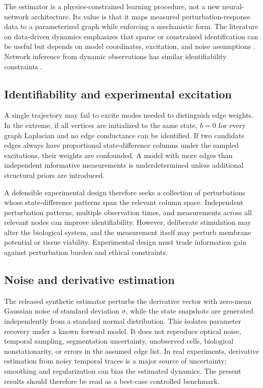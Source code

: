 \documentclass[12pt,a4paper]{article}
\begin{document}
The estimator is a physics-constrained learning procedure, not a new neural-network architecture. Its value is that it maps measured perturbation-response data to a parameterized graph while enforcing a mechanistic form. The literature on data-driven dynamics emphasizes that sparse or constrained identification can be useful but depends on model coordinates, excitation, and noise assumptions \citep{Brunton2016}. Network inference from dynamic observations has similar identifiability constraints \citep{ShandilyaTimme2011}.

\subsection{Identifiability and experimental excitation}
A single trajectory may fail to excite modes needed to distinguish edge weights. In the extreme, if all vertices are initialized to the same state, \(b=0\) for every graph Laplacian and no edge conductance can be identified. If two candidate edges always have proportional state-difference columns under the sampled excitations, their weights are confounded. A model with more edges than independent informative measurements is underdetermined unless additional structural priors are introduced.

A defensible experimental design therefore seeks a collection of perturbations whose state-difference patterns span the relevant column space. Independent perturbation patterns, multiple observation times, and measurements across all relevant nodes can improve identifiability. However, deliberate stimulation may alter the biological system, and the measurement itself may perturb membrane potential or tissue viability. Experimental design must trade information gain against perturbation burden and ethical constraints.

\subsection{Noise and derivative estimation}
The released synthetic estimator perturbs the derivative vector with zero-mean Gaussian noise of standard deviation \(\sigma\), while the state snapshots are generated independently from a standard normal distribution. This isolates parameter recovery under a known forward model. It does not reproduce optical noise, temporal sampling, segmentation uncertainty, unobserved cells, biological nonstationarity, or errors in the assumed edge list. In real experiments, derivative estimation from noisy temporal traces is a major source of uncertainty; smoothing and regularization can bias the estimated dynamics. The present results should therefore be read as a best-case controlled benchmark.
\end{document}
